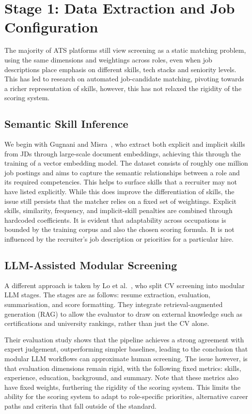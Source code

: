 \section{Stage 1: Data Extraction and Job Configuration}
\label{sec:lit-extensibility}

The majority of ATS platforms still view screening as a static matching problem, using the same dimensions
and weightings across roles, even when job descriptions place emphasis on different skills, tech stacks
and seniority levels. This has led to research on automated job-candidate matching, pivoting towards
a richer representation of skills, however, this has not relaxed the rigidity of the scoring system.

\subsection{Semantic Skill Inference}
We begin with Gugnani and Misra~\cite{gugnani2020}, who extract both explicit and implicit skills from JDs through
large-scale document embeddings, achieving this through the training of a vector embedding model. The dataset consists
of roughly one million job postings and aims to capture the semantic relationships between a role and its
required competencies. This helps to surface skills that a recruiter may not have listed explicitly.
While this does improve the differentiation of skills, the issue still persists that the matcher relies on
a fixed set of weightings. Explicit skills, similarity, frequency, and implicit-skill penalties are combined
through hardcoded coefficients. It is evident that adaptability across occupations is bounded by the 
training corpus and also the chosen scoring formula. It is not influenced by the recruiter's job description
or priorities for a particular hire.

\subsection{LLM-Assisted Modular Screening}
A different approach is taken by Lo et al.~\cite{lo2025aihiring}, who split CV screening into modular LLM stages.
The stages are as follows: resume extraction, evaluation, summarisation, and score formatting.
They integrate retrieval-augmented generation (RAG) to allow the evaluator to draw on external knowledge such
as certifications and university rankings, rather than just the CV alone.

Their evaluation study shows that the pipeline achieves a strong agreement with expert judgement, outperforming 
simpler baselines, leading to the conclusion that modular LLM workflows can approximate human screening.
The issue however, is that evaluation dimensions remain rigid, with the following fixed metrics:
skills, experience, education, background, and summary. Note that these metrics also have fixed weights,
furthering the rigidity of the scoring system. This limits the ability for the scoring system to adapt to
role-specific priorities, alternative career paths and criteria that fall outside of the standard.

